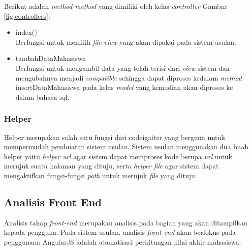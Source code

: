	Berikut adalah \textit{method-method} yang dimiliki oleh kelas \textit{controller} Gambar \ref{fig:controllers}:
\begin{itemize}
	\item index()\\
	Berfungsi untuk memilih \textit{file view} yang akan dipakai pada sistem usulan.
	\item tambahDataMahasiswa\\
	Berfungsi untuk mengambil data yang telah terisi dari \textit{view} sistem dan mengubahnya menjadi \textit{compatible} sehingga dapat diproses kedalam \textit{method} insertDataMahasiswa pada kelas \textit{model} yang kemudian akan diproses ke dalam bahasa sql.
\end{itemize}
	
	\subsubsection{Helper}
	\label{sub: Helper}
	Helper merupakan salah satu fungsi dari codeigniter yang berguna untuk mempermudah pembuatan sistem usulan. Sistem usulan menggunakan dua buah helper yaitu \textit{helper url} agar sistem dapat memproses kode berupa \textit{url} untuk merujuk suatu halaman yang dituju, serta \textit{helper file} agar sistem dapat mengaktifkan fungsi-fungsi \textit{path} untuk merujuk \textit{file} yang dituju.
	
	\subsection{Analisis Front End}
	\label{sub: frontEnd}
	
	Analisis tahap \textit{front-end} merupakan analisis pada bagian yang akan ditampilkan kepada pengguna. Pada sistem usulan, analisis \textit{front-end} akan berfokus pada penggunaan AngularJS adalah otomatisasi perhitungan nilai akhir mahasiswa. 
	
